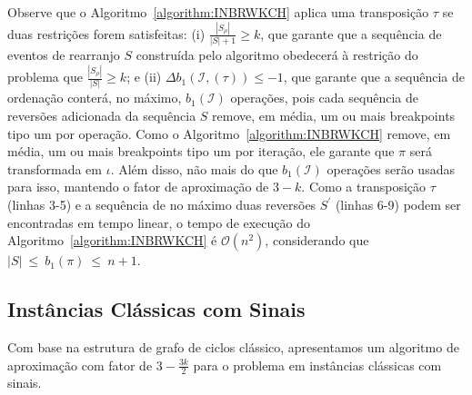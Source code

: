 

Observe que o Algoritmo~\ref{algorithm:INBRWKCH} aplica uma transposição $\tau$ se duas restrições forem satisfeitas: (i) $\frac{|S_{\rho}|}{|S| + 1} \ge k$, que garante que a sequência de eventos de rearranjo $S$ construída pelo algoritmo obedecerá à restrição do problema que $\frac{|S_{\rho}|}{|S|} \ge k$; e (ii) $\Delta b_1(\mathcal{I}, (\tau)) \le -1$, que garante que a sequência de ordenação conterá, no máximo, $b_1(\mathcal{I})$ operações, pois cada sequência de reversões adicionada da sequência $S$ remove, em média, um ou mais breakpoints tipo um por operação. Como o Algoritmo~\ref{algorithm:INBRWKCH} remove, em média, um ou mais breakpoints tipo um por iteração, ele garante que $\pi$ será transformada em $\iota$. Além disso, não mais do que $b_1(\mathcal{I})$ operações serão usadas para isso, mantendo o fator de aproximação de $3-k$. Como a transposição $\tau$ (linhas 3-5) e a sequência de no máximo duas reversões $S^{\prime}$ (linhas 6-9) podem ser encontradas em tempo linear, o tempo de execução do Algoritmo~\ref{algorithm:INBRWKCH} é $\mathcal{O}(n^2)$, considerando que $|S|~\le~b_1(\pi)~\le~{n + 1}$.

\subsection{Instâncias Clássicas com Sinais}

Com base na estrutura de grafo de ciclos clássico, apresentamos um algoritmo de aproximação com fator de $3-\frac{3k}{2}$ para o problema \SbPRT{} em instâncias clássicas com sinais.

